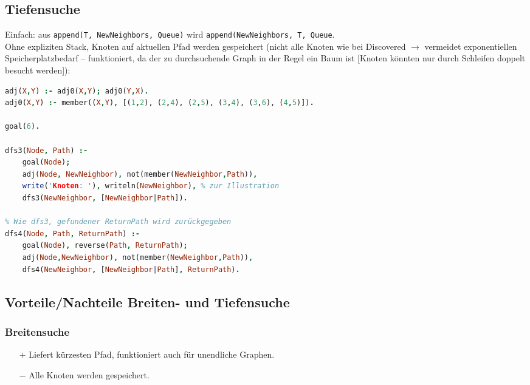 \subsection{Tiefensuche}
Einfach: aus \lstinline`append(T, NewNeighbors, Queue)` wird \lstinline`append(NewNeighbors, T, Queue`.\\
Ohne expliziten Stack, Knoten auf aktuellen Pfad werden gespeichert (nicht alle Knoten wie bei Discovered $\to$ vermeidet exponentiellen Speicherplatzbedarf -- funktioniert, da der zu durchsuchende Graph in der Regel ein Baum ist [Knoten könnten nur durch Schleifen doppelt besucht werden]):
\begin{lstlisting}[language=Prolog]
% Adjazenzrelation des ungerichteten Graphen (nicht effizient)
adj(X,Y) :- adj0(X,Y); adj0(Y,X).
adj0(X,Y) :- member((X,Y), [(1,2), (2,4), (2,5), (3,4), (3,6), (4,5)]).

goal(6).

dfs3(Node, Path) :-
	goal(Node);
	adj(Node, NewNeighbor), not(member(NewNeighbor,Path)),
	write('Knoten: '), writeln(NewNeighbor), % zur Illustration
	dfs3(NewNeighbor, [NewNeighbor|Path]).

% Wie dfs3, gefundener ReturnPath wird zurückgegeben
dfs4(Node, Path, ReturnPath) :-
	goal(Node), reverse(Path, ReturnPath);
	adj(Node,NewNeighbor), not(member(NewNeighbor,Path)),
	dfs4(NewNeighbor, [NewNeighbor|Path], ReturnPath).
\end{lstlisting}

\subsection{Vorteile/Nachteile Breiten- und Tiefensuche}
\subsubsection*{Breitensuche}
\begin{itemize}
\item[$+$] Liefert kürzesten Pfad, funktioniert auch für unendliche Graphen.
\item[$-$] Alle Knoten werden gespeichert.
\end{itemize}

